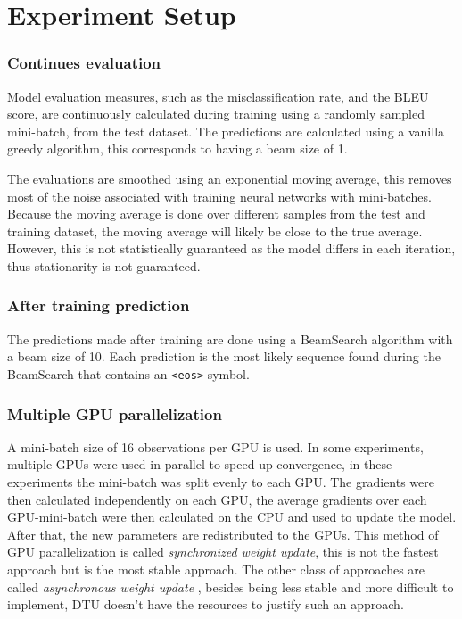 
\section{Experiment Setup}

\subsubsection{Continues evaluation}
Model evaluation measures, such as the misclassification rate, and the BLEU score, are continuously calculated during training using a randomly sampled mini-batch, from the test dataset. The predictions are calculated using a vanilla greedy algorithm, this corresponds to having a beam size of 1.

The evaluations are smoothed using an exponential moving average, this removes most of the noise associated with training neural networks with mini-batches. Because the moving average is done over different samples from the test and training dataset, the moving average will likely be close to the true average. However, this is not statistically guaranteed as the model differs in each iteration, thus stationarity is not guaranteed.

\subsubsection{After training prediction}
The predictions made after training are done using a BeamSearch algorithm with a beam size of 10. Each prediction is the most likely sequence found during the BeamSearch that contains an \texttt{<eos>} symbol.

\subsubsection{Multiple GPU parallelization}
A mini-batch size of 16 observations per GPU is used. In some experiments, multiple GPUs were used in parallel to speed up convergence, in these experiments the mini-batch was split evenly to each GPU. The gradients were then calculated independently on each GPU, the average gradients over each GPU-mini-batch were then calculated on the CPU and used to update the model. After that, the new parameters are redistributed to the GPUs. This method of GPU parallelization is called \textit{synchronized weight update}, this is not the fastest approach but is the most stable approach. The other class of approaches are called \textit{asynchronous weight update} \cite{async-sgd}, besides being less stable and more difficult to implement, DTU doesn't have the resources to justify such an approach.

